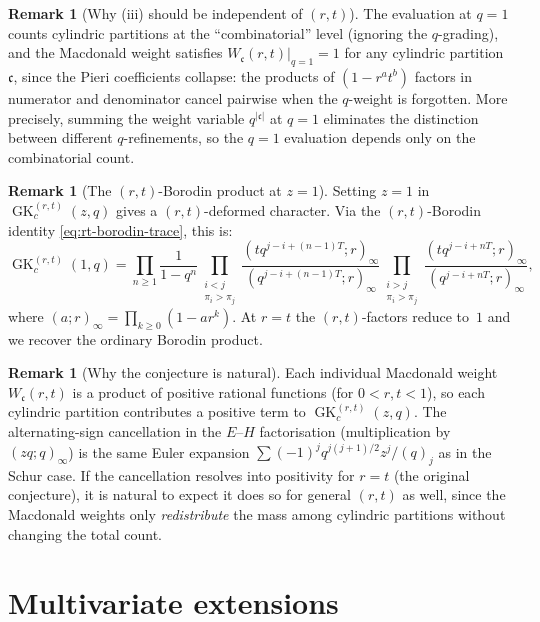 \documentclass[11pt]{article}
\theoremstyle{plain}
\theoremstyle{definition}
\newtheorem{remark}[theorem]{Remark}
\newcommand{\GK}{\operatorname{GK}}
\newcommand{\qpoch}[2]{(#1;#2)_\infty}
\newcommand{\qpochn}[3]{(#1;#2)_{#3}}
\begin{document}
\begin{remark}[Why (iii) should be independent of $(r,t)$]
The evaluation at $q = 1$ counts cylindric partitions at the
``combinatorial'' level (ignoring the $q$-grading), and the Macdonald
weight satisfies $W_{\mathfrak{c}}(r,t)\big|_{q=1} = 1$ for any
cylindric partition $\mathfrak{c}$, since the Pieri coefficients
collapse: the products of $(1 - r^a t^b)$ factors in numerator and
denominator cancel pairwise when the $q$-weight is forgotten.
More precisely, summing the weight variable $q^{|\mathfrak{c}|}$
at $q = 1$ eliminates the distinction between different
$q$-refinements, so the $q = 1$ evaluation depends only on the
combinatorial count.
\end{remark}

\begin{remark}[The $(r,t)$-Borodin product at $z = 1$]
Setting $z = 1$ in $\GK_c^{(r,t)}(z,q)$ gives a $(r,t)$-deformed
character.  Via the $(r,t)$-Borodin identity
\eqref{eq:rt-borodin-trace}, this is:
\[
  \GK_c^{(r,t)}(1,q) = \prod_{n \geq 1} \frac{1}{1-q^n}
  \prod_{\substack{i < j \\ \pi_i > \pi_j}}
    \frac{\qpochn{tq^{j-i+(n-1)T}}{r}{\infty}}
         {\qpochn{q^{j-i+(n-1)T}}{r}{\infty}}
  \prod_{\substack{i > j \\ \pi_i > \pi_j}}
    \frac{\qpochn{tq^{j-i+nT}}{r}{\infty}}
         {\qpochn{q^{j-i+nT}}{r}{\infty}},
\]
where $(a;r)_\infty = \prod_{k \geq 0}(1 - ar^k)$.
At $r = t$ the $(r,t)$-factors reduce to~$1$ and we recover the
ordinary Borodin product.
\end{remark}

\begin{remark}[Why the conjecture is natural]
Each individual Macdonald weight $W_{\mathfrak{c}}(r,t)$ is a product of
positive rational functions (for $0 < r, t < 1$), so each cylindric
partition contributes a positive term to $\GK_c^{(r,t)}(z,q)$.
The alternating-sign cancellation in the $E$--$H$ factorisation
(multiplication by $\qpoch{zq}{q}$) is the same Euler expansion
$\sum (-1)^j q^{j(j+1)/2} z^j / (q)_j$ as in the Schur case.
If the cancellation resolves into positivity for $r = t$ (the original
conjecture), it is natural to expect it does so for general $(r,t)$
as well, since the Macdonald weights only \emph{redistribute} the mass
among cylindric partitions without changing the total count.
\end{remark}


\section{Multivariate extensions}
\label{sec:multivariate}
\end{document}
